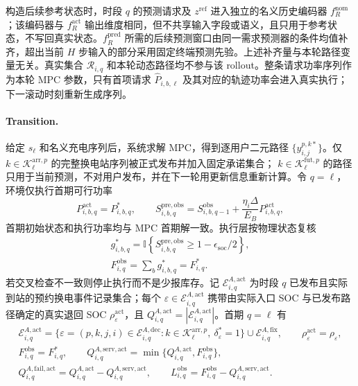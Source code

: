 \documentclass[12pt,a4paper,UTF8]{ctexart}
\begin{document}
构造后续参考状态时，时段 $q$ 的预测请求及 $z^{\mathrm{ref}}$ 进入独立的名义历史编码器 $f_R^{\mathrm{nom}}$；该编码器与 $f_R^{\mathrm{act}}$ 输出维度相同，但不共享输入字段或语义，且只用于参考状态，不写回真实状态。$f_R^{\mathrm{pred}}$ 所需的后续预测窗口由同一需求预测器的条件均值补齐，超出当前 $H$ 步输入的部分采用固定终端预测先验。上述补齐量与本轮路径变量无关。真实集合 $\mathcal R_{i,q}$ 和本轮动态路径均不参与该 rollout。整条请求功率序列作为本轮 MPC 参数，只有首项请求 $\widehat P_{i,b,\ell}$ 及其对应的轨迹功率会进入真实执行；下一滚动时刻重新生成序列。

\paragraph{Transition.}
给定 $s_\ell$ 和名义充电序列后，系统求解 MPC，得到逐用户二元路径
$\{y_{i,j}^{p,k*}\}$。仅
$k\in\mathcal K_\ell^{\mathrm{arr},p}$ 的完整换电站序列被正式发布并加入固定承诺集合；
$k\in\mathcal K_\ell^{\mathrm{fut},p}$ 的路径只用于当前预测，不对用户发布，并在下一轮用更新信息重新计算。令 $q=\ell$，环境仅执行首期可行功率
\begin{equation}
P_{i,b,q}^{\mathrm{act}}=P_{i,b,q}^{*},
\qquad
S_{i,b,q}^{\mathrm{pre,obs}}
=S_{i,b,q-1}^{\mathrm{obs}}
+\frac{\eta_i\Delta}{E_B}P_{i,b,q}^{\mathrm{act}},
\label{eq:actual_first_step_charging}
\end{equation}
首期初始状态和执行功率均与 MPC 首期解一致。执行层按物理状态复核
\begin{equation}
\begin{gathered}
g_{i,b,q}^{*}
=\mathbb I\!\left\{
S_{i,b,q}^{\mathrm{pre,obs}}
\ge1-\epsilon_{\mathrm{soc}}/2
\right\},\\
F_{i,q}^{\mathrm{obs}}
=\sum_b g_{i,b,q}^{*}
=F_{i,q}^{*}.
\end{gathered}
\label{eq:first_stage_physical_crosscheck}
\end{equation}
若交叉检查不一致则停止执行而不是少报库存。记 $\mathcal E_{i,q}^{A,\mathrm{act}}$ 为时段 $q$ 已发布且实际到站的预约换电事件记录集合；每个 $\varepsilon\in\mathcal E_{i,q}^{A,\mathrm{act}}$ 携带由实际入口 SOC 与已发布路径确定的真实退回 SOC $\rho_\varepsilon^{\mathrm{act}}$，且 $Q_{i,q}^{A,\mathrm{act}}=|\mathcal E_{i,q}^{A,\mathrm{act}}|$。首期 $q=\ell$ 有
\begin{equation}
\begin{gathered}
\mathcal E_{i,q}^{A,\mathrm{act}}
=\{\varepsilon=(p,k,j,i)\in
\mathcal E_{i,q}^{A,\mathrm{dec}}:
k\in\mathcal K_\ell^{\mathrm{arr},p},\ \delta_\varepsilon^*=1\}
\cup\mathcal E_{i,q}^{A,\mathrm{fix}},
\qquad
\rho_\varepsilon^{\mathrm{act}}=\rho_\varepsilon,\\
F_{i,q}^{\mathrm{obs}}=F_{i,q}^*,
\qquad
Q_{i,q}^{A,\mathrm{serv,act}}
=\min\{Q_{i,q}^{A,\mathrm{act}},F_{i,q}^{\mathrm{obs}}\},\\
Q_{i,q}^{A,\mathrm{fail,act}}
=Q_{i,q}^{A,\mathrm{act}}-Q_{i,q}^{A,\mathrm{serv,act}},
\qquad
L_{i,q}^{\mathrm{obs}}
=F_{i,q}^{\mathrm{obs}}-Q_{i,q}^{A,\mathrm{serv,act}}.
\end{gathered}
\label{eq:actual_reservation_feasibility}
\end{equation}
\end{document}
